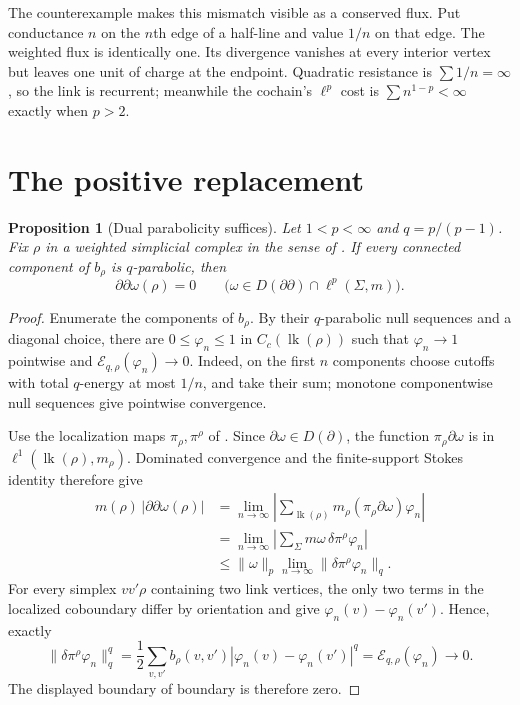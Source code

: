 \documentclass[11pt,a4paper]{article}
\newtheorem{proposition}{Proposition}
\newcommand{\E}{\mathcal E}
\begin{document}
The counterexample makes this mismatch visible as a conserved flux. Put conductance $n$ on the $n$th edge of a half-line and value $1/n$ on that edge. The weighted flux is identically one. Its divergence vanishes at every interior vertex but leaves one unit of charge at the endpoint. Quadratic resistance is $\sum 1/n=\infty$, so the link is recurrent; meanwhile the cochain's $\ell^p$ cost is $\sum n^{1-p}<\infty$ exactly when $p>2$.

\section{The positive replacement}

\begin{proposition}[Dual parabolicity suffices]\label{prop:positive}
Let $1<p<\infty$ and $q=p/(p-1)$. Fix $\rho$ in a weighted simplicial complex in the sense of \cite{BK}. If every connected component of $b_\rho$ is $q$-parabolic, then
\[
  \partial\partial\omega(\rho)=0
  \qquad
  \bigl(\omega\in D(\partial\partial)\cap\ell^p(\Sigma,m)\bigr).
\]
\end{proposition}

\begin{proof}
Enumerate the components of $b_\rho$. By their $q$-parabolic null sequences and a diagonal choice, there are $0\leq\varphi_n\leq1$ in $C_c(\operatorname{lk}(\rho))$ such that $\varphi_n\to1$ pointwise and $\E_{q,\rho}(\varphi_n)\to0$. Indeed, on the first $n$ components choose cutoffs with total $q$-energy at most $1/n$, and take their sum; monotone componentwise null sequences give pointwise convergence.

Use the localization maps $\pi_\rho,\pi^\rho$ of \cite{BK}. Since $\partial\omega\in D(\partial)$, the function $\pi_\rho\partial\omega$ is in $\ell^1(\operatorname{lk}(\rho),m_\rho)$. Dominated convergence and the finite-support Stokes identity therefore give
\begin{align*}
 m(\rho)\,|\partial\partial\omega(\rho)|
 &=\lim_{n\to\infty}
   \left|\sum_{\operatorname{lk}(\rho)}
       m_\rho(\pi_\rho\partial\omega)\varphi_n\right|\\
 &=\lim_{n\to\infty}
   \left|\sum_{\Sigma}m\omega\,\delta\pi^\rho\varphi_n\right|\\
 &\leq \|\omega\|_p
       \lim_{n\to\infty}\|\delta\pi^\rho\varphi_n\|_q.
\end{align*}
For every simplex $vv'\rho$ containing two link vertices, the only two terms in the localized coboundary differ by orientation and give $\varphi_n(v)-\varphi_n(v')$. Hence, exactly
\[
 \|\delta\pi^\rho\varphi_n\|_q^q
 =\frac12\sum_{v,v'}b_\rho(v,v')
       |\varphi_n(v)-\varphi_n(v')|^q
 =\E_{q,\rho}(\varphi_n)\longrightarrow0.
\]
The displayed boundary of boundary is therefore zero.
\end{proof}
\end{document}
